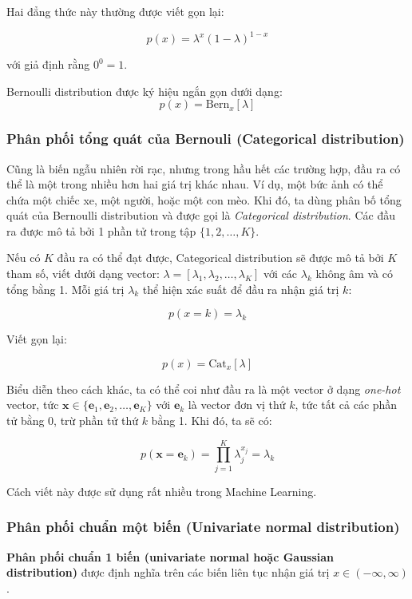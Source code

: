\documentclass[../main-report.tex]{subfiles}
\begin{document}
Hai đẳng thức này thường được viết gọn lại:

\begin{equation}
p(x) = \lambda^x (1 - \lambda)^{1 - x}
\end{equation}

với giả định rằng \(0 ^0 = 1\).

Bernoulli distribution được ký hiệu ngắn gọn dưới dạng:
\[
  p(x) = \text{Bern}_x [\lambda]
\]

\subsubsection*{Phân phối tổng quát của Bernouli (Categorical distribution)}
Cũng là biến ngẫu nhiên rời rạc, nhưng trong hầu hết các trường hợp, đầu ra có thể là một trong nhiều hơn hai giá trị khác nhau. Ví dụ, một bức ảnh có thể chứa một chiếc xe, một người, hoặc một con mèo. Khi đó, ta dùng phân bố tổng quát của Bernoulli distribution và được gọi là \emph{Categorical distribution}. Các đầu ra được mô tả bởi 1 phần tử trong tập \(\{1, 2, \dots, K\}\).

Nếu có \(K\) đầu ra có thể đạt được, Categorical distribution sẽ được mô tả bởi \(K\) tham số, viết dưới dạng vector: \(\lambda = [\lambda_1, \lambda_2, \dots, \lambda_K]\) với các \(\lambda_k\) không âm và có tổng bằng 1. Mỗi giá trị \(\lambda_k\) thể hiện xác suất để đầu ra nhận giá trị \(k\):

\[
  p(x = k) = \lambda_k
\]

Viết gọn lại:

\[
  p(x) = \text{Cat}_x [\lambda]
\]

Biểu diễn theo cách khác, ta có thể coi như đầu ra là một vector ở dạng \emph{one-hot} vector, tức \(\mathbf{x} \in \{\mathbf{e}_1, \mathbf{e}_2, \dots, \mathbf{e}_K\}\) với \(\mathbf{e}_k\) là vector đơn vị thứ \(k\), tức tất cả các phần tử bằng 0, trừ phần tử thứ \(k\) bằng 1. Khi đó, ta sẽ có:

\begin{equation}
p(\mathbf{x} = \mathbf{e}_k) = \prod_{j=1}^K \lambda_j^{x_j} = \lambda_k
\end{equation}

Cách viết này được sử dụng rất nhiều trong Machine Learning.

\subsubsection*{Phân phối chuẩn một biến (Univariate normal distribution)}
\textbf{Phân phối chuẩn 1 biến (univariate normal hoặc Gaussian distribution)} được định nghĩa trên các biến liên tục nhận giá trị \(x \in (-\infty, \infty)\).
\end{document}
